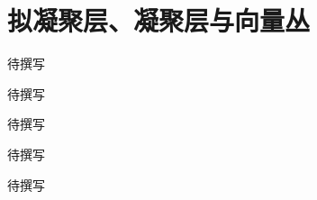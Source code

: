 
% 
% 

\chapter{拟凝聚层、凝聚层与向量丛}
\label{g5:ch:13}

\begin{chapterabstract}
待撰写
\end{chapterabstract}

\begin{learninggoals}
待撰写
\end{learninggoals}

待撰写







\begin{chaptersummary}
待撰写
\end{chaptersummary}

\BookExercises
待撰写

